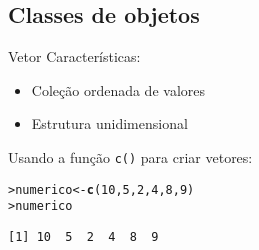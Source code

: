 \documentclass[10pt,handout]{beamer}\usepackage{graphicx, color}
\makeatletter
\newcommand{\hlfunctioncall}[1]{\textcolor[rgb]{0,0,0.545098039215686}{\textbf{#1}}}%
\newenvironment{kframe}{%
 \def\at@end@of@kframe{}%
 \ifinner\ifhmode%
  \def\at@end@of@kframe{\end{minipage}}%
  \begin{minipage}{\columnwidth}%
 \fi\fi%
 \def\FrameCommand##1{\hskip\@totalleftmargin \hskip-\fboxsep
 \colorbox{shadecolor}{##1}\hskip-\fboxsep
     \hskip-\linewidth \hskip-\@totalleftmargin \hskip\columnwidth}%
 \MakeFramed {\advance\hsize-\width
   \@totalleftmargin\z@ \linewidth\hsize
   \@setminipage}}%
 {\par\unskip\endMakeFramed%
 \at@end@of@kframe}
\newenvironment{knitrout}{}{} %
\makeatother
\begin{document}
\subsection[Classes]{Classes de objetos}

\begin{frame}[fragile=singleslide]{Vetor}
Características:
\begin{itemize}
\item Coleção ordenada de valores
\item Estrutura unidimensional
\end{itemize}
Usando a função \texttt{c()} para criar vetores:
\begin{knitrout}\small
{}\color{fgcolor}\begin{kframe}
\begin{alltt}
> numerico <- \hlfunctioncall{c}(10, 5, 2, 4, 8, 9)
> numerico
\end{alltt}
\begin{verbatim}
[1] 10  5  2  4  8  9
\end{verbatim}
\end{kframe}
\end{knitrout}

\end{frame}
\end{document}
